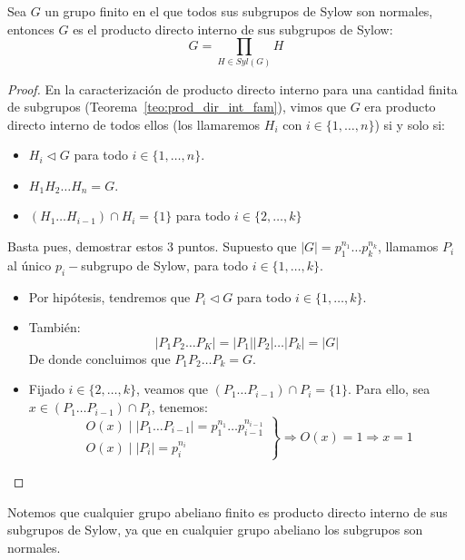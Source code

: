 \begin{teo}
    Sea $G$ un grupo finito en el que todos sus subgrupos de Sylow son normales, entonces $G$ es el producto directo interno de sus subgrupos de Sylow:
    \begin{equation*}
        G = \prod_{H\in Syl(G)} H
    \end{equation*}
    \begin{proof}
        En la caracterización de producto directo interno para una cantidad finita de subgrupos (Teorema~\ref{teo:prod_dir_int_fam}), vimos que $G$ era producto directo interno de todos ellos (los llamaremos $H_i$ con $i \in \{1,\ldots,n\}$) si y solo si:
        \begin{itemize}
            \item $H_i \lhd G$ para todo $i \in \{1,\ldots,n\}$.
            \item $H_1H_2\ldots H_n = G$.
            \item $(H_1\ldots H_{i-1}) \cap H_i = \{1\}$ para todo $i \in \{2,\ldots,k\}$
        \end{itemize}
        Basta pues, demostrar estos 3 puntos. Supuesto que $|G| = p_1^{n_1} \ldots p_k^{n_k}$, llamamos $P_i$ al único $p_i-$subgrupo de Sylow, para todo $i \in \{1,\ldots,k\}$.

        \begin{itemize}
            \item Por hipótesis, tendremos que $P_i \lhd G$ para todo $i \in \{1,\ldots,k\}$.
            \item También:
                \begin{equation*}
                    |P_1P_2 \ldots P_K| = |P_1||P_2|\ldots |P_k| = |G|
                \end{equation*}
                De donde concluimos que $P_1P_2\ldots P_k = G$.
            \item Fijado $i \in \{2,\ldots,k\}$, veamos que $(P_1 \ldots P_{i-1}) \cap P_i = \{1\}$. Para ello, sea $x\in (P_1 \ldots P_{i-1}) \cap P_i$, tenemos:
                \begin{equation*}
                    \left.\begin{array}{r}
                        O(x) \mid |P_1\ldots P_{i-1}| = p_1^{n_1} \ldots p_{i-1}^{n_{i-1}} \\
                        O(x) \mid |P_i| = p_i^{n_i}
                    \end{array}\right\} \Longrightarrow O(x) = 1 \Longrightarrow x = 1
                \end{equation*}\qedhere
        \end{itemize}
    \end{proof}
\end{teo}

\begin{observacion}
    Notemos que cualquier grupo abeliano finito es producto directo interno de sus subgrupos de Sylow, ya que en cualquier grupo abeliano los subgrupos son normales.
\end{observacion}





